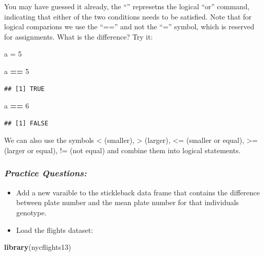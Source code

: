 \documentclass[]{article}
\newenvironment{Shaded}{\begin{snugshade}}{\end{snugshade}}
\newcommand{\DecValTok}[1]{\textcolor[rgb]{0.00,0.00,0.81}{#1}}
\newcommand{\KeywordTok}[1]{\textcolor[rgb]{0.13,0.29,0.53}{\textbf{#1}}}
\newcommand{\NormalTok}[1]{#1}
\newcommand{\OperatorTok}[1]{\textcolor[rgb]{0.81,0.36,0.00}{\textbf{#1}}}
\newcommand{\StringTok}[1]{\textcolor[rgb]{0.31,0.60,0.02}{#1}}
\begin{document}
You may have guessed it already, the ``\textbar{}'' represetns the
logical ``or'' command, indicating that either of the two conditions
needs to be satisfied. Note that for logical comparions we use the
``=='' and not the ``='' symbol, which is reserved for assignments. What
is the difference? Try it:

\begin{Shaded}
\begin{Highlighting}[]
\NormalTok{a =}\StringTok{ }\DecValTok{5}

\NormalTok{a }\OperatorTok{==}\StringTok{ }\DecValTok{5}
\end{Highlighting}
\end{Shaded}

\begin{verbatim}
## [1] TRUE
\end{verbatim}

\begin{Shaded}
\begin{Highlighting}[]
\NormalTok{a }\OperatorTok{==}\StringTok{ }\DecValTok{6}
\end{Highlighting}
\end{Shaded}

\begin{verbatim}
## [1] FALSE
\end{verbatim}

We can also use the symbols \textless{} (smaller), \textgreater{}
(larger), \textless{}= (smaller or equal), \textgreater{}= (larger or
equal), != (not equal) and combine them into logical statements.

\hypertarget{practice-questions}{%
\subsubsection{\texorpdfstring{\emph{Practice
Questions:}}{Practice Questions:}}\label{practice-questions}}

\begin{itemize}
\item
  Add a new varaible to the stickleback data frame that contains the
  difference between plate number and the mean plate number for that
  individuals genotype.
\item
  Load the flights dataset:
\end{itemize}

\begin{Shaded}
\begin{Highlighting}[]
\KeywordTok{library}\NormalTok{(nycflights13)}
\end{Highlighting}
\end{Shaded}
\end{document}
